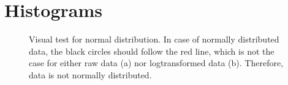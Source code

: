 \section{Histograms}


\begin{center}
	\begin{figure}[H]
		\caption[Testing normal distribution]{Visual test for normal distribution. In case of normally distributed data, the black circles should follow the red line, which is not the case for either raw data (a) nor logtransformed data (b). Therefore, data is not normally distributed.}
		\label{fig:NormDis}
	\end{figure}
\end{center}


